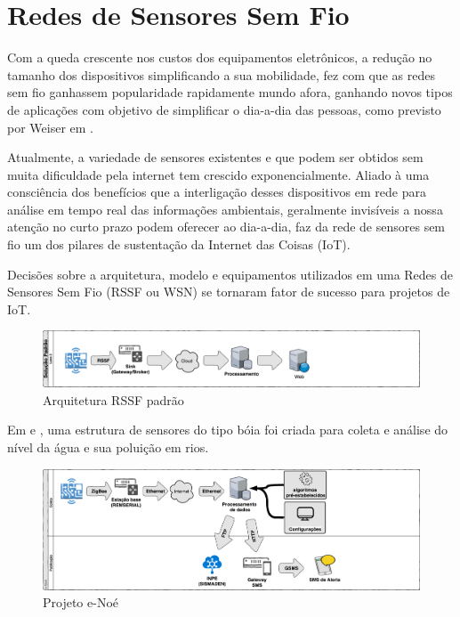 \section{Redes de Sensores Sem Fio}
\cite{Silva2009}
Com a queda crescente nos custos dos equipamentos eletrônicos, a redução no tamanho dos dispositivos simplificando a sua mobilidade, fez com que as redes sem fio ganhassem popularidade rapidamente mundo afora, ganhando novos tipos de aplicações com objetivo de simplificar o dia-a-dia das pessoas, como previsto por Weiser em \cite{Weiser1991}. 

Atualmente, a variedade de sensores\cite{SensoresXXXX} existentes e que podem ser obtidos sem muita dificuldade pela internet tem crescido exponencialmente. Aliado à uma consciência dos benefícios que a interligação desses dispositivos em rede para análise em tempo real das informações ambientais, geralmente invisíveis a nossa atenção no curto prazo \cite{Weiser:1997:CAC:504928.504934} podem oferecer ao dia-a-dia, faz da rede de sensores sem fio um dos pilares de sustentação da Internet das Coisas (IoT).

Decisões sobre a arquitetura, modelo e equipamentos utilizados em uma Redes de Sensores Sem Fio \cite{LECKER2010} (RSSF ou WSN) se tornaram fator de sucesso para projetos de IoT.

\begin{figure}[tbh!]
	\centering
	\includegraphics[width=1.0\textwidth]{../images/padrao_rede}
	\caption{Arquitetura RSSF padrão}
	\label{fig:rssfpadrao}
\end{figure}

Em \cite{Ueyama002840382} e \cite{Furquim002744726}, uma estrutura de sensores do tipo b\'{o}ia foi criada para coleta e análise do nível da água e sua poluição em rios.

\begin{figure}[tbh!]
	\centering
	\includegraphics[width=1.0\textwidth]{../images/enoe_rede}
	\caption{Projeto e-Noé}
	\label{fig:enoe}
\end{figure}

